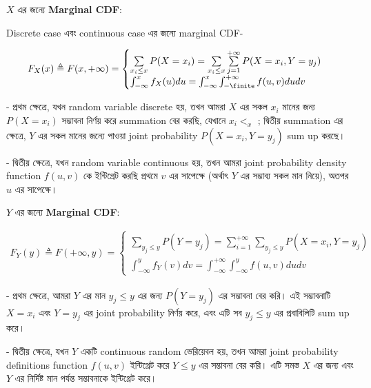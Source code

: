 \documentclass[graybox, envcountchap, twocolumn]{styles/svmult}
\begin{document}
$X$ {\bengalifont এর জন্যে } \textbf{Marginal CDF}:

{\bengalifont Discrete case এবং continuous case এর জন্যে marginal CDF-  }

\begin{equation}\begin{split}
F_X(x) \triangleq F(x,+\infty) = 
\begin{cases}
\sum\limits_{x_i \leq x} P(X=x_i) = \sum\limits_{x_i \leq x} \sum\limits_{j=1}^{+\infty} P(X=x_i,Y=y_j) \\
\int_{-\infty}^{x} f_X(u)du = \int_{-\infty}^{x} \int_{-\finite}^{+\infty} f(u, v) du dv
\end{cases}
\end{split}\end{equation}


    - {\bengalifont প্রথম ক্ষেত্রে, যখন random variable discrete হয়, তখন আমরা $X$ এর সকল  $x_i$ মানের জন্য $P(X=x_i)$ সম্ভাবনা নির্ণয় করে summation বের করছি, যেখানে $x_i <_ x $ ; দ্বিতীয় summation এর ক্ষেত্রে, $Y$ এর সকল মানের জন্যে পাওয়া joint probability $P(X=x_i,Y=y_j)$ sum up করছে।   }

    - {\bengalifont দ্বিতীয় ক্ষেত্রে, যখন random variable continuous হয়, তখন আমরা joint probability density function $f(u,v)$ কে ইন্টিগ্রেট করছি প্রথমে $v$ এর সাপেক্ষে (অর্থাৎ $Y$ এর সম্ভাব্য সকল মান নিয়ে), অতপর $u$ এর সাপেক্ষে।}

$Y$ {\bengalifont এর জন্যে } \textbf{Marginal CDF}:

\begin{equation}\begin{split}
F_Y(y) \triangleq F(+\infty, y) = 
\begin{cases}
\sum\limits_{y_j \leq y} P(Y=y_j) = \sum\limits_{i=1}^{+\infty} \sum\limits_{y_j \leq y} P(X=x_i,Y=y_j) \\
\int_{-\infty}^{y} f_Y(v) dv = \int_{-\infty}^{+\infty} \int_{-\infty}^{y} f(u, v) du dv
\end{cases}
\end{split}\end{equation}

-   {\bengalifont প্রথম ক্ষেত্রে, আমরা $Y$ এর মান $y_j \leq y$ এর জন্য $P(Y=y_j)$ এর সম্ভাবনা বের করি। এই সম্ভাবনাটি $X=x_i$ এবং $Y=y_j$ এর joint probability নির্ণয় করে, এবং এটি সব $y_j \leq y$ এর প্রবাবিলিটি sum  up করে। }

-   {\bengalifont দ্বিতীয় ক্ষেত্রে, যখন $Y$ একটি continuous random ভেরিয়েবল হয়, তখন আমরা joint  probability definitions function  $f(u, v)$ ইন্টিগ্রেট করে $Y \leq y$ এর সম্ভাবনা বের করি। এটি সমস্ত $X$ এর জন্য এবং $Y$ এর নির্দিষ্ট মান পর্যন্ত সম্ভাবনাকে ইন্টিগ্রেট করে।}
\end{document}
